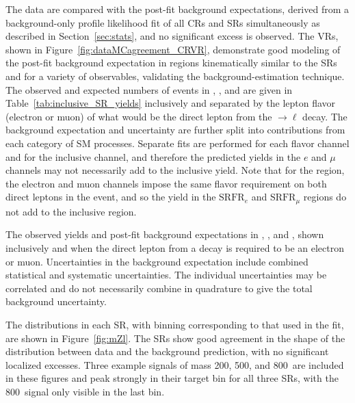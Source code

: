 


The data are compared with the post-fit background expectations, derived from a background-only profile likelihood fit of all CRs and SRs simultaneously as described in Section~\ref{sec:stats}, and no significant excess is observed.
The VRs, shown in Figure~\ref{fig:dataMCagreement_CRVR}, demonstrate good modeling of the post-fit background expectation in regions kinematically similar to the SRs and for a variety of observables, validating the background-estimation technique.
The observed and expected numbers of events in \SRFR, \SRFour, and \SRThree are given in Table~\ref{tab:inclusive_SR_yields} 
inclusively and separated by the lepton flavor (electron or muon) of what would be the direct lepton from the \chone$\rightarrow$\Zboson$\ell$ decay.
The background expectation and uncertainty are further split into contributions from each category of SM processes.
Separate fits are performed for each flavor channel and for the inclusive channel, and therefore the predicted yields in the $e$ and $\mu$ channels may not necessarily add to the inclusive yield.
Note that for the \SRFR region, the electron and muon channels impose the same flavor requirement on both direct leptons in the event, and so the yield in the $\text{SRFR}_{e}$ and $\text{SRFR}_{\mu}$ regions do not add to the inclusive \SRFR region.

\begin{table}
\caption[The observed yields and post-fit background expectations in \SRTL, \SRFour, and \SRThree, shown inclusively and when the direct lepton from a \chono decay is required to be an electron or muon.]{
  The observed yields and post-fit background expectations in \SRTL, \SRFour, and \SRThree, shown inclusively and when the direct lepton from a \chono decay is required to be an electron or muon.
  \captionlegend
  Uncertainties in the background expectation include combined statistical and systematic uncertainties.
  The individual uncertainties may be correlated and do not necessarily combine in quadrature to give the total background uncertainty.
}
\label{tab:inclusive_SR_yields}

\end{table}

The \mZl distributions in each SR, with binning corresponding to that used in the fit, are shown in Figure~\ref{fig:mZl}.
The SRs show good agreement in the shape of the \mZl distribution between data and the background prediction, with no significant localized excesses.
Three example signals of mass 200, 500, and 800~\GeV are included in these figures and peak strongly in their target \mZl bin for all three SRs, with the 800~\GeV signal only visible in the last \mZl bin.

